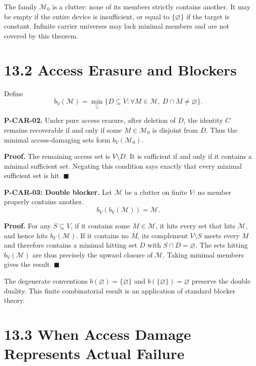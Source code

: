 \documentclass[
  english,
  11pt,
  oneside]{book}
\newcounter{none} %
\begin{document}
The family \(\mathcal M_0\) is a clutter: none of its members strictly contains another. It may be empty if the entire device is insufficient, or equal to \(\{\varnothing\}\) if the target is constant. Infinite carrier universes may lack minimal members and are not covered by this theorem.

\section{13.2 Access Erasure and Blockers}\label{access-erasure-and-blockers}

Define \[b_V(\mathcal M)=
\min_{\subseteq}\{D\subseteq V:\forall M\in\mathcal M,\ D\cap M\ne\varnothing\}.\]

\hypertarget{p-car-02}{}\label{p-car-02}

\textbf{P-CAR-02.} Under pure access erasure, after deletion of \(D\), the identity \(C\) remains recoverable if and only if some \(M\in\mathcal M_0\) is disjoint from \(D\). Thus the minimal access-damaging sets form \(b_V(\mathcal M_0)\).

\textbf{Proof.} The remaining access set is \(V\setminus D\). It is sufficient if and only if it contains a minimal sufficient set. Negating this condition says exactly that every minimal sufficient set is hit. \(\blacksquare\)

\hypertarget{p-car-03}{}\label{p-car-03}

\textbf{P-CAR-03: Double blocker.} Let \(\mathcal M\) be a clutter on finite \(V\): no member properly contains another. \[b_V(b_V(\mathcal M))=\mathcal M.\]

\textbf{Proof.} For any \(S\subseteq V\), if it contains some \(M\in\mathcal M\), it hits every set that hits \(\mathcal M\), and hence hits \(b_V(\mathcal M)\). If it contains no \(M\), its complement \(V\setminus S\) meets every \(M\) and therefore contains a minimal hitting set \(D\) with \(S\cap D=\varnothing\). The sets hitting \(b_V(\mathcal M)\) are thus precisely the upward closure of \(\mathcal M\). Taking minimal members gives the result. \(\blacksquare\)

The degenerate conventions \(b(\varnothing)=\{\varnothing\}\) and \(b(\{\varnothing\})=\varnothing\) preserve the double duality. This finite combinatorial result is an application of standard blocker theory.

\section{13.3 When Access Damage Represents Actual Failure}\label{when-access-damage-represents-actual-failure}
\end{document}
